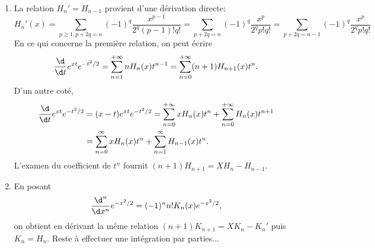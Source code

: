 \begin{enonce}
\begin{solution}
\begin{enumerate}
    \item La relation $H_n'=H_{n-1}$ provient d'une dérivation directe:
      \begin{equation*}
        H_n'(x) 
        = \sum_{p\geq1, p+2q=n} (-1)^q \frac{x^{p-1}}{2^q(p-1)!q!}
        = \sum_{p+2q=n} (-1)^q \frac{x^{p}}{2^q p! q!}
        = \sum_{p+2q=n-1} (-1)^q \frac{x^{p}}{2^q p! q!}
      \end{equation*}
      En ce qui concerne la première relation, on peut écrire
      \begin{equation*}
        \frac{\d}{\d t} e^{xt} e^{-t^2/2} 
        = \sum_{n=1}^{+\infty} n H_n(x) t^{n-1}
        = \sum_{n=0}^{+\infty} (n+1) H_{n+1}(x) t^{n}.
      \end{equation*}
      D'un autre coté,
      \begin{align*}
        \frac{\d}{\d t} e^{xt} e^{-t^2/2} 
        &= (x-t) e^{xt}e^{-t^2/2} = \sum_{n=0}^{+\infty} x H_n(x) t^n + \sum_{n=0}^{+\infty} H_n(x) t^{n+1}\\
        &= \sum_{n=0}^{\infty} x H_n(x) t^n + \sum_{n=1}^{\infty} H_{n-1}(x)t^n.
      \end{align*}
      L'examen du coefficient de $t^n$ fournit $(n+1)H_{n+1} = X H_n - H_{n-1}$.


    \item En posant
      \begin{equation*}
        \frac{\d^n}{\d x^n} e^{-x^2/2} = (-1)^n n! K_n(x) e^{-x^2/2},
      \end{equation*}
      on obtient en dérivant la même relation $(n+1)K_{n+1}=X K_n - K_n'$ puis $K_n = H_n$.
      Reste à effectuer une intégration par parties...
  \end{enumerate}
\end{solution}
\end{enonce}
